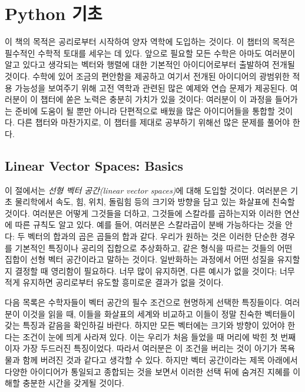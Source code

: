 %
%
%
\chapter{Python 기초}
\label{ch:1} %


이 책의 목적은 공리로부터 시작하여 양자 역학에 도입하는 것이다. 이 챕터의 목적은 필수적인 수학적 토대를 세우는 데 있다. 앞으로 필요할 모든 수학은 아마도 여러분이 알고 있다고 생각되는 벡터와 행렬에 대한 기본적인 아이디어로부터 출발하여 전개될 것이다. 수학에 있어 조금의 편안함을 제공하고 여기서 전개된 아이디어의 광범위한 적용 가능성을 보여주기 위해 고전 역학과 관련된 많은 예제와 연습 문제가 제공된다. 여러분이 이 챕터에 쏟은 노력은 충분히 가치가 있을 것이다: 여러분이 이 과정을 들어가는 준비에 도움이 될 뿐만 아니라 단편적으로 배웠을 많은 아이디어들을 통합할 것이다. 다른 챕터와 마찬가지로, 이 챕터를 제대로 공부하기 위해선 많은 문제를 풀어야 한다.

\section{Linear Vector Spaces: Basics}

이 절에서는 \emph{선형 벡터 공간(linear vector spaces)}에 대해 도입할 것이다. 여러분은 기초 물리학에서 속도, 힘, 위치, 돌림힘 등의 크기와 방향을 담고 있는 화살표에 친숙할 것이다. 여러분은 어떻게 그것들을 더하고, 그것들에 스칼라를 곱하는지와 이러한 연산에 따른 규칙도 알고 있다. 예를 들어, 여러분은 스칼라곱이 분배 가능하다는 것을 안다: 두 벡터의 합과의 곱은 곱들의 합과 같다. 우리가 원하는 것은 이러한 단순한 경우를 기본적인 특징이나 공리의 집합으로 추상화하고, 같은 형식을 따르는 것들의 어떤 집합이 선형 벡터 공간이라고 말하는 것이다. 일반화하는 과정에서 어떤 성질을 유지할 지 결정할 때 영리함이 필요하다. 너무 많이 유지하면, 다른 예시가 없을 것이다; 너무 적게 유지하면 공리로부터 유도할 흥미로운 결과가 없을 것이다.

다음 목록은 수학자들이 벡터 공간의 필수 조건으로 현명하게 선택한 특징들이다. 여러분이 이것을 읽을 때, 이들을 화살표의 세계와 비교하고 이들이 정말 친숙한 벡터들이 갖는 특징과 같음을 확인하길 바란다. 하지만 모든 벡터에는 크기와 방향이 있어야 한다는 조건이 눈에 띄게 사라져 있다. 이는 우리가 처음 들었을 때 머리에 박힌 첫 번째이자 가장 두드러진 특징이었다. 따라서 여러분은 이 조건을 버리는 것이 아기가 목욕물과 함께 버려진 것과 같다고 생각할 수 있다. 하지만 벡터 공간이라는 제목 아래에서 다양한 아이디어가 통일되고 종합되는 것을 보면서 이러한 선택 뒤에 숨겨진 지혜를 이해할 충분한 시간을 갖게될 것이다. 

